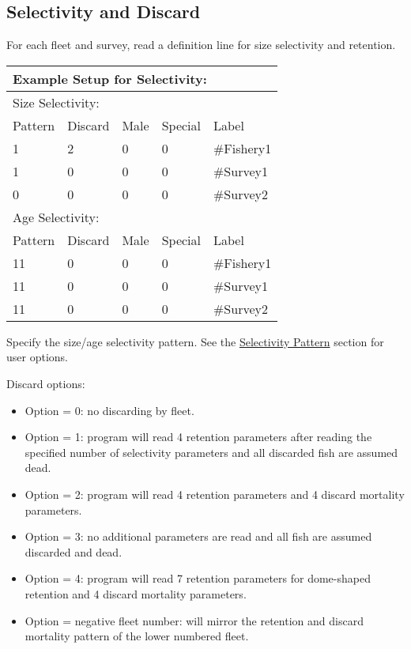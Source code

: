 \subsection{Selectivity and Discard}
For each fleet and survey, read a definition line for size selectivity and retention. 

\begin{center}
	\begin{longtable}{p{2cm} p{2cm} p{2cm} p{2cm} p{6.5cm}}
		\multicolumn{5}{l}{Example Setup for Selectivity:} \Tstrut\\
		\hline
		\multicolumn{5}{l}{Size Selectivity:} \Tstrut\\
		Pattern & Discard & Male & Special & Label \Bstrut\\
		\hline
		1 & 2 & 0 & 0 & \#Fishery1 \Tstrut\\
		1 & 0 & 0 & 0 & \#Survey1 \\
		0 & 0 & 0 & 0 & \#Survey2 \Bstrut\\
		\hline
		
		\multicolumn{5}{l}{Age Selectivity:} \Tstrut\\
		Pattern & Discard & Male & Special & Label \Bstrut\\
		\hline
		11 & 0 & 0 & 0 & \#Fishery1 \Tstrut\\
		11 & 0 & 0 & 0 & \#Survey1 \\
		11 & 0 & 0 & 0 & \#Survey2 \Bstrut\\
		\hline
	\end{longtable}
\end{center}

Specify the size/age selectivity pattern. See the \hyperlink{SelexPattern}{Selectivity Pattern} section for user options.

\hypertarget{DomeRetention}{Discard options:}
\begin{itemize}
	\item Option = 0: no discarding by fleet.
	\item Option = 1: program will read 4 retention parameters after reading the specified number of selectivity parameters and all discarded fish are assumed dead.
	\item Option = 2: program will read 4 retention parameters and 4 discard mortality parameters.
	\item Option = 3: no additional parameters are read and all fish are assumed discarded and dead.
	\item Option = 4: program will read 7 retention parameters for dome-shaped retention and 4 discard mortality parameters.
	\item Option = negative fleet number: will mirror the retention and discard mortality pattern of the lower numbered fleet.
\end{itemize}

